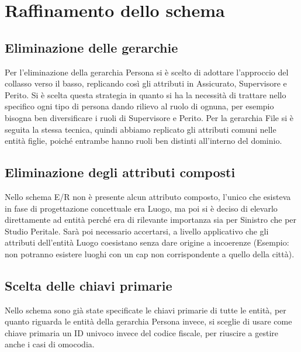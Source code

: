 \documentclass[a4paper,12pt]{report}
\begin{document}
\clearpage
\section{Raffinamento dello schema}

\subsection{Eliminazione delle gerarchie}
Per l’eliminazione della gerarchia Persona si è scelto di adottare l’approccio del collasso verso il basso, replicando così gli attributi in Assicurato, Supervisore e Perito.
Si è scelta questa strategia in quanto si ha la necessità di trattare nello specifico ogni tipo di persona dando rilievo al ruolo di ognuna, per esempio bisogna ben diversificare i ruoli di Supervisore e Perito.
Per la gerarchia File si è seguita la stessa tecnica, quindi abbiamo replicato gli attributi comuni nelle entità figlie, poiché entrambe hanno ruoli ben distinti all'interno del dominio.
\\
\subsection{Eliminazione degli attributi composti}
Nello schema E/R non è presente alcun attributo composto, l'unico che esisteva in fase di progettazione concettuale era Luogo, ma poi si è deciso di elevarlo direttamente ad entità perché era di rilevante importanza sia per Sinistro che per Studio Peritale.
Sarà poi necessario accertarsi, a livello applicativo che gli attributi dell'entità Luogo coesistano senza dare origine a incoerenze (Esempio: non potranno esistere luoghi con un cap non corrispondente a quello della città).
\\
\subsection{Scelta delle chiavi primarie}
Nello schema sono già state specificate le chiavi primarie di tutte le entità, per quanto riguarda le entità della gerarchia Persona invece, si sceglie di usare come chiave primaria un ID univoco invece del codice fiscale, per riuscire a gestire anche i casi di omocodia.

\clearpage
\end{document}
